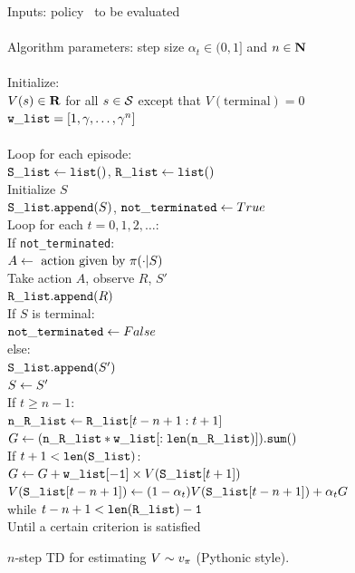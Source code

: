 \begin{table}
\beginalg
Inputs: policy \pol\ to be evaluated\\
\\
Algorithm parameters: step size $\alpha_t \in (0, 1]$ and $n\in{\mbox{\bf N}}$\\
\\
Initialize:\\
\> $V(s)\in\mathbf{R}$ for all $s\in\mathcal{S}$ except that $V(\mathrm{terminal})=0$\\
\> ${\tt w\_list} = [1, \gamma, \ldots, \gamma^{n}]$\\
\\
Loop for each episode:\\
\> ${\tt S\_list} \leftarrow {\tt list()}$, ${\tt R\_list} \leftarrow {\tt list()}$\\
\> Initialize $S$\\
\> ${\tt S\_list.append}(S)$, ${\tt not\_terminated} \leftarrow True$\\
\> Loop for each $t=0,1,2,\ldots$:\\
\> \> If {\tt not\_terminated}:\\
\> \> \> $A \leftarrow \mbox{ action given by } \pi(\cdot|S)$\\
\> \> \> Take action $A$, observe $R$, $S'$\\
\> \> \> ${\tt R\_list.append}(R)$\\
\> \> \> If $S$ is terminal:\\
\> \> \> \> ${\tt not\_terminated} \leftarrow False$\\
\> \> \> else:\\
\> \> \> \> ${\tt S\_list.append}(S')$\\
\> \> \> \> $S \leftarrow S'$\\
\> \> If $t \geq n-1$:\\
\> \> \> ${\tt n\_R\_list} \leftarrow {\tt R\_list}[t-n+1:t+1]$\\
\> \> \> $G \leftarrow {\tt (n\_R\_list * w\_list[:len(n\_R\_list)]).sum()}$\\
\> \> \> If $t+1 < {\tt len(S\_list)}$:\\
\> \> \> \> $G \leftarrow G + {\tt w\_list[-1]} \times V({\tt S\_list}[t+1])$\\
\> \> \> $V({\tt S\_list}[t-n+1]) \leftarrow (1-\alpha_{t}) V({\tt S\_list}[t-n+1]) + \alpha_{t} G$\\
\> while $t-n+1 < {\tt len(R\_list)-1}$\\
Until a certain criterion is satisfied
\endalg
\caption{$n$-step TD for estimating $V\sim v_{\pi}$ (Pythonic style).}
\label{tab:alg:n-step-td-prediction-python-style}
\end{table}


